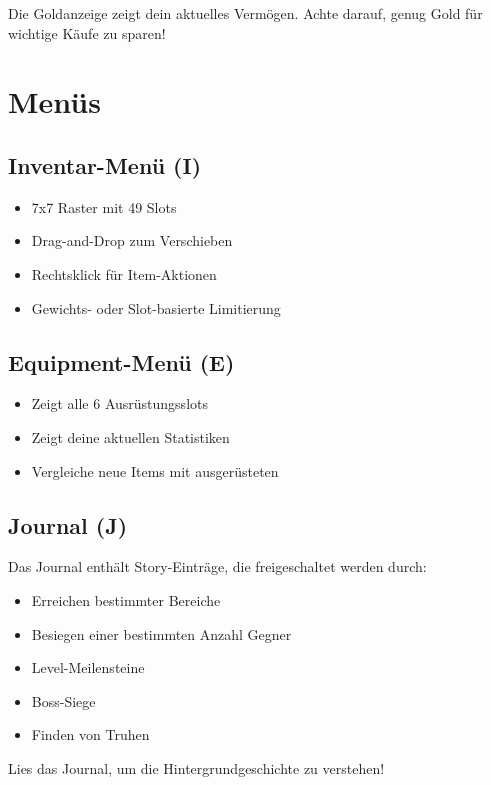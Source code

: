 \documentclass[
  a4paper,
  11pt,
  ngerman,
  parskip=half,
  bibliography=totoc,
  listof=totoc
]{scrreprt}
\begin{document}
Die Goldanzeige zeigt dein aktuelles Vermögen. Achte darauf, genug Gold für wichtige Käufe zu sparen!

\section{Menüs}

\subsection{Inventar-Menü (I)}

\begin{itemize}
    \item 7x7 Raster mit 49 Slots
    \item Drag-and-Drop zum Verschieben
    \item Rechtsklick für Item-Aktionen
    \item Gewichts- oder Slot-basierte Limitierung
\end{itemize}

\subsection{Equipment-Menü (E)}

\begin{itemize}
    \item Zeigt alle 6 Ausrüstungsslots
    \item Zeigt deine aktuellen Statistiken
    \item Vergleiche neue Items mit ausgerüsteten
\end{itemize}

\subsection{Journal (J)}

Das Journal enthält Story-Einträge, die freigeschaltet werden durch:
\begin{itemize}
    \item Erreichen bestimmter Bereiche
    \item Besiegen einer bestimmten Anzahl Gegner
    \item Level-Meilensteine
    \item Boss-Siege
    \item Finden von Truhen
\end{itemize}

Lies das Journal, um die Hintergrundgeschichte zu verstehen!
\end{document}
